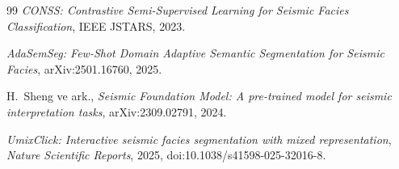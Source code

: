 \documentclass[conference,a4paper,10pt]{IEEEtran}
\begin{document}
\begin{thebibliography}{99}
\textit{CONSS: Contrastive Semi-Supervised Learning for Seismic Facies
Classification}, IEEE JSTARS, 2023.

\textit{AdaSemSeg: Few-Shot Domain Adaptive Semantic Segmentation for
Seismic Facies}, arXiv:2501.16760, 2025.

H.~Sheng ve ark., \textit{Seismic Foundation Model: A pre-trained model
for seismic interpretation tasks}, arXiv:2309.02791, 2024.

\textit{UmixClick: Interactive seismic facies segmentation with mixed
representation}, \textit{Nature Scientific Reports}, 2025,
doi:10.1038/s41598-025-32016-8.

\end{thebibliography}
\end{document}
